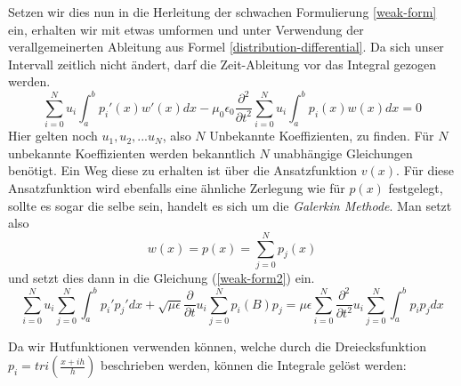 	
	Setzen wir dies nun in die Herleitung der schwachen Formulierung \ref{weak-form} ein, erhalten wir mit etwas umformen und unter Verwendung der verallgemeinerten Ableitung aus Formel \ref{distribution-differential}. Da sich unser Intervall zeitlich nicht ändert, darf die Zeit-Ableitung vor das Integral gezogen werden.
	\begin{equation}
	\sum_{i = 0}^{N} u_i   \int_{a}^{b} p_i'(x) w'(x) dx - 
	\mu_0 \epsilon_0 \frac{\partial ^2 }{\partial t^2} \sum_{i = 0}^{N} u_i \int_{a}^{b}p_i(x)w(x) dx = 0
	\label{weak-form2}
	\end{equation}
	Hier gelten noch $u_1,u_2,...u_N$, also $N$ Unbekannte Koeffizienten, zu finden. Für $N$ unbekannte Koeffizienten werden bekanntlich $N$ unabhängige Gleichungen benötigt. Ein Weg diese zu erhalten ist über die Ansatzfunktion $v(x)$. Für diese Ansatzfunktion wird ebenfalls eine ähnliche Zerlegung wie für $p(x)$ festgelegt, sollte es sogar die selbe sein, handelt es sich um die \textit{Galerkin Methode}. Man setzt also
	\begin{equation}
	w(x) = p(x) = \sum_{j = 0}^{N} p_j(x)
	\end{equation}
	und setzt dies dann in die Gleichung (\ref{weak-form2}) ein.
	\begin{equation}
	\sum_{i = 0}^{N} u_i \sum_{j = 0}^{N}\int_{a}^{b} p_i' p_j' dx 
	+ 
	\sqrt{\mu \epsilon} \frac{\partial}{\partial t} u_i \sum_{j = 0}^{N} p_i(B) p_j
	= 
	\mu \epsilon \sum_{i = 0}^{N} \frac{\partial ^2 }{\partial t^2} u_i 
	\sum_{j = 0}^{N} \int_{a}^{b} p_i p_j dx
	\end{equation}
	
	Da wir Hutfunktionen verwenden können, welche durch die Dreiecksfunktion $p_i = tri(\frac{x + ih}{h})$ beschrieben werden, können die Integrale gelöst werden:
	

